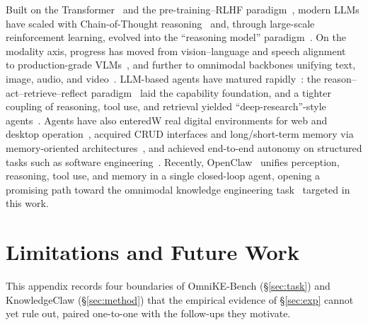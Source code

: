 \documentclass{article}
\begin{document}
Built on the Transformer~\citep{Transformer} and the pre-training--RLHF paradigm~\citep{BERT, GPT3, InstructGPT}, modern LLMs have scaled with Chain-of-Thought reasoning~\citep{CoT, ToT, LLMsurvey} and, through large-scale reinforcement learning, evolved into the ``reasoning model'' paradigm~\citep{GPT-o1, DeepSeek-R1, Qwen3}. On the modality axis, progress has moved from vision--language and speech alignment~\citep{CLIP, Whisper, Llava} to production-grade VLMs~\citep{GPT4, Qwen3-VL}, and further to omnimodal backbones unifying text, image, audio, and video~\citep{Qwen3-Omni, Qwen3.5-Omni, Dynin-Omni, OmniRAG-Agent, OmniGAIA, Gemini3}. LLM-based agents have matured rapidly~\citep{AgentSurvey}: the reason--act--retrieve--reflect paradigm~\citep{ReAct, Reflexion, SelfRAG, Toolformer} laid the capability foundation, and a tighter coupling of reasoning, tool use, and retrieval yielded ``deep-research''-style agents~\citep{Search-o1, Search-R1}. Agents have also enteredW real digital environments for web and desktop operation~\citep{WebArena, OSWorld, ClawGUI}, acquired CRUD interfaces and long/short-term memory via memory-oriented architectures~\citep{Graphiti, MemGPT, Mem0, A-MEM, AgenticMemory, HyperMem}, and achieved end-to-end autonomy on structured tasks such as software engineering~\citep{SWE-agent, OpenHands, ClaudeCode}. Recently, OpenClaw~\citep{OpenClaw} unifies perception, reasoning, tool use, and memory in a single closed-loop agent, opening a promising path toward the omnimodal knowledge engineering task~\citep{Cognee, LLMWiki, Graphify} targeted in this work.

\section{Limitations and Future Work}\label{app:limit}

This appendix records four boundaries of OmniKE-Bench (\S\ref{sec:task}) and KnowledgeClaw (\S\ref{sec:method}) that the empirical evidence of \S\ref{sec:exp} cannot yet rule out, paired one-to-one with the follow-ups they motivate.
\end{document}
